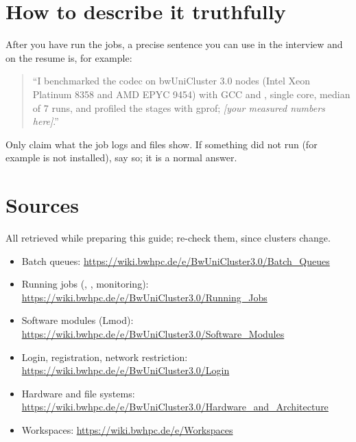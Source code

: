 \section{How to describe it truthfully}

After you have run the jobs, a precise sentence you can use in the interview and on the resume is, for example:

\begin{quote}
``I benchmarked the codec on bwUniCluster 3.0 nodes (Intel Xeon Platinum 8358 and AMD EPYC 9454) with GCC and , single core, median of 7 runs, and profiled the stages with gprof; \emph{[your measured numbers here]}.''
\end{quote}

Only claim what the job logs and  files show. If something did not run (for example  is not installed), say so; it is a normal answer.

\section{Sources}

All retrieved while preparing this guide; re-check them, since clusters change.
\begin{itemize}\small
\item Batch queues: \url{https://wiki.bwhpc.de/e/BwUniCluster3.0/Batch_Queues}
\item Running jobs (, , monitoring): \url{https://wiki.bwhpc.de/e/BwUniCluster3.0/Running_Jobs}
\item Software modules (Lmod): \url{https://wiki.bwhpc.de/e/BwUniCluster3.0/Software_Modules}
\item Login, registration, network restriction: \url{https://wiki.bwhpc.de/e/BwUniCluster3.0/Login}
\item Hardware and file systems: {\small\url{https://wiki.bwhpc.de/e/BwUniCluster3.0/Hardware_and_Architecture}}
\item Workspaces: \url{https://wiki.bwhpc.de/e/Workspaces}
\end{itemize}
